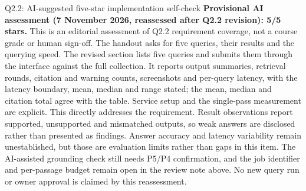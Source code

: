 \begin{review}{Q2.2: AI-suggested five-star implementation self-check}
\quad\textbf{Provisional AI assessment (7 November 2026, reassessed after Q2.2 revision): 5/5 stars.} This is an editorial assessment of Q2.2 requirement coverage, not a course grade or human sign-off. The handout asks for five queries, their results and the querying speed. The revised section lists five queries and submits them through the interface against the full collection. It reports output summaries, retrieval rounds, citation and warning counts, screenshots and per-query latency, with the latency boundary, mean, median and range stated; the mean, median and citation total agree with the table. Service setup and the single-pass measurement are explicit. This directly addresses the requirement. Result observations report supported, unsupported and mismatched outputs, so weak answers are disclosed rather than presented as findings. Answer accuracy and latency variability remain unestablished, but those are evaluation limits rather than gaps in this item. The AI-assisted grounding check still needs P5/P4 confirmation, and the job identifier and per-passage budget remain open in the review note above. No new query run or owner approval is claimed by this reassessment.
\end{review}
